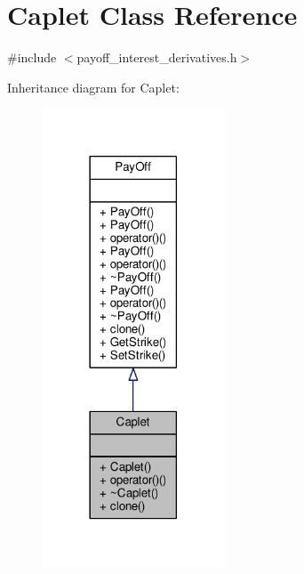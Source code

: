 \hypertarget{classCaplet}{}\section{Caplet Class Reference}
\label{classCaplet}


{\ttfamily \#include $<$payoff\+\_\+interest\+\_\+derivatives.\+h$>$}



Inheritance diagram for Caplet\+:
\nopagebreak
\begin{figure}[H]
\begin{center}
\leavevmode
\includegraphics[width=153pt]{classCaplet__inherit__graph}
\end{center}
\end{figure}


